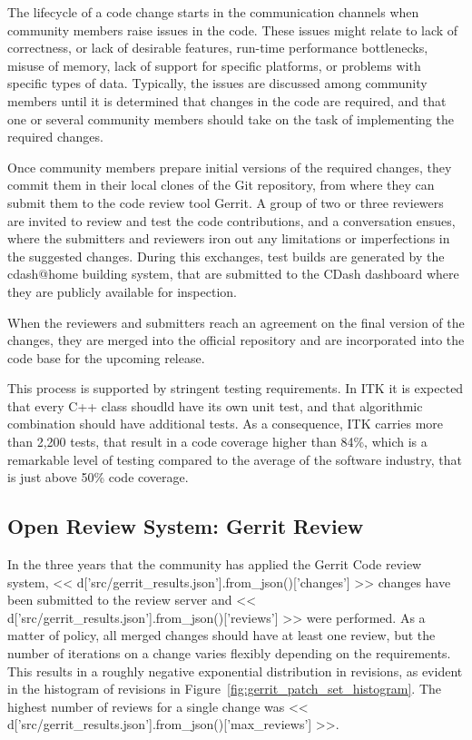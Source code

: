 \documentclass{frontiersENG} %
\begin{document}
The lifecycle of a code change starts in the communication channels when
community members raise issues in the code. These issues might relate to lack
of correctness, or lack of desirable features, run-time performance
bottlenecks, misuse of memory, lack of support for specific platforms, or
problems with specific types of data. Typically, the issues are discussed among
community members until it is determined that changes in the code are required,
and that one or several community members should take on the task of
implementing the required changes.

Once community members prepare initial versions of the required changes, they
commit them in their local clones of the Git repository, from where they can
submit them to the code review tool Gerrit. A group of two or three reviewers
are invited to review and test the code contributions, and a conversation
ensues, where the submitters and reviewers iron out any limitations or
imperfections in the suggested changes. During this exchanges, test builds are
generated by the cdash@home building system, that are submitted to the CDash
dashboard where they are publicly available for inspection.

When the reviewers and submitters reach an agreement on the final version of
the changes, they are merged into the official repository and are incorporated
into the code base for the upcoming release.

This process is supported by stringent testing requirements. In ITK it is
expected that every C++ class shoudld have its own unit test, and that
algorithmic combination should have additional tests. As a consequence, ITK
carries more than 2,200 tests, that result in a code coverage higher than 84\%,
which is a remarkable level of testing compared to the average of the software
industry, that is just above 50\% code coverage.

\subsection{Open Review System: Gerrit Review}
In the three years that the community has applied the Gerrit Code review
system, << d['src/gerrit_results.json'].from_json()['changes'] >> changes have
been submitted to the review server and
<< d['src/gerrit_results.json'].from_json()['reviews'] >> were performed.
As a matter of policy, all merged changes should have at least one review,
but the number of iterations on a change varies flexibly depending on the
requirements. This results in a roughly negative exponential distribution in
revisions, as evident in the histogram of revisions in
Figure~\ref{fig:gerrit_patch_set_histogram}.  The highest number of reviews
for a single change was
<< d['src/gerrit_results.json'].from_json()['max_reviews'] >>.
\end{document}
